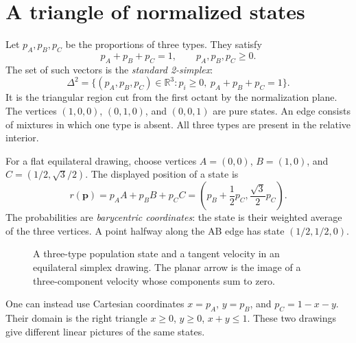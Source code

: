 \documentclass[11pt,oneside,openany]{book}
\theoremstyle{definition}
\theoremstyle{remark}
\newcommand{\R}{\mathbb{R}}
\newcommand{\p}{\mathbf{p}}
\numberwithin{equation}{chapter}
\begin{document}
\section{A triangle of normalized states}
Let $p_A,p_B,p_C$ be the proportions of three types. They satisfy
\[
p_A+p_B+p_C=1,\qquad p_A,p_B,p_C\geq0.
\]
The set of such vectors is the \emph{standard 2-simplex}:
\[
\Delta^2=\{(p_A,p_B,p_C)\in\R^3:p_i\geq0,\ p_A+p_B+p_C=1\}.
\]
It is the triangular region cut from the first octant by the normalization plane. The vertices $(1,0,0)$, $(0,1,0)$, and $(0,0,1)$ are pure states. An edge consists of mixtures in which one type is absent. All three types are present in the relative interior.

For a flat equilateral drawing, choose vertices $A=(0,0)$, $B=(1,0)$, and $C=(1/2,\sqrt3/2)$. The displayed position of a state is
\begin{equation}\label{eq:barycentric}
r(\p)=p_AA+p_BB+p_CC=\left(p_B+\frac12p_C,\frac{\sqrt3}{2}p_C\right).
\end{equation}
The probabilities are \emph{barycentric coordinates}: the state is their weighted average of the three vertices. A point halfway along the AB edge has state $(1/2,1/2,0)$.

\begin{figure}[htbp]
\centering
{}
\caption{A three-type population state and a tangent velocity in an equilateral simplex drawing. The planar arrow is the image of a three-component velocity whose components sum to zero.}
\end{figure}

One can instead use Cartesian coordinates $x=p_A$, $y=p_B$, and $p_C=1-x-y$. Their domain is the right triangle $x\geq0$, $y\geq0$, $x+y\leq1$. These two drawings give different linear pictures of the same states.
\end{document}
